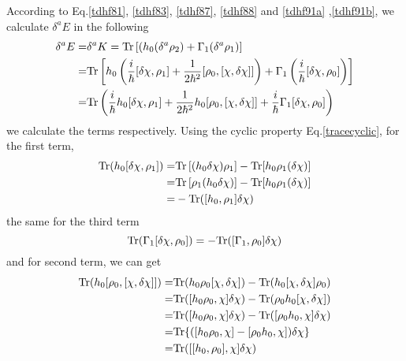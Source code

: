   According to Eq.\eqref{tdhf81}, \eqref{tdhf83}, \eqref{tdhf87}, \eqref{tdhf88} and \eqref{tdhf91a} ,\eqref{tdhf91b}, we calculate $\delta^aE$ in the following
  \begin{equation}
    \begin{aligned}
          \delta^a E =& \delta^a K = {\rm Tr}\left[(h_0(\delta^a\rho_2) + \Gamma_1(\delta^a\rho_1)\right]\\  \label{tdhf95}
          =& {\rm Tr}\left[ h_0\left( \frac{i}{\hbar} [\delta\chi,\rho_1] + \frac{1}{2\hbar^2}[\rho_0, [\chi, \delta\chi]] \right) + \Gamma_1\left( \frac{i}{\hbar}[\delta\chi, \rho_0] \right) \right]\\
          =& {\rm Tr}\left( \frac{i}{\hbar} h_0 [\delta\chi,\rho_1] + \frac{1}{2\hbar^2} h_0 [\rho_0, [\chi, \delta\chi]] + \frac{i}{\hbar} \Gamma_1 [\delta\chi, \rho_0] \right)
    \end{aligned}
  \end{equation}
  we calculate the terms respectively. Using the cyclic property Eq.\eqref{tracecyclic}, for the first term,
  \begin{equation}
    \begin{aligned}
      {\rm Tr}(h_0 [\delta\chi,\rho_1]) =& {\rm Tr}\left[ (h_0\delta\chi)\rho_1] - {\rm Tr}[h_0\rho_1(\delta\chi) \right]\\ \label{tdhf96}
      =& {\rm Tr}\left[ \rho_1(h_0\delta\chi)] - {\rm Tr}[h_0\rho_1(\delta\chi) \right]\\
      =& -{\rm Tr}([h_0 ,\rho_1]\delta\chi)
    \end{aligned}
  \end{equation}
  the same for the third term
  \begin{equation}
    {\rm Tr}(\Gamma_1 [\delta\chi,\rho_0]) = -{\rm Tr}([\Gamma_1,\rho_0]\delta\chi) \label{tdhf97}
  \end{equation}
  and for second term, we can get
  \begin{equation}
    \begin{aligned}
      {\rm Tr}(h_0 [\rho_0, [\chi, \delta\chi]]) =&{\rm Tr}(h_0\rho_0[\chi,\delta\chi]) - {\rm Tr}(h_0[\chi,\delta\chi]\rho_0)\\ \label{tdhf98}
      =& {\rm Tr}([h_0\rho_0,\chi]\delta\chi) - {\rm Tr}(\rho_0h_0[\chi,\delta\chi])\\
      =& {\rm Tr}([h_0\rho_0,\chi]\delta\chi) - {\rm Tr}([\rho_0h_0,\chi]\delta\chi)\\
      =& {\rm Tr}\{([h_0\rho_0,\chi] - [\rho_0h_0,\chi])\delta\chi\}\\
      =& {\rm Tr}([[h_0, \rho_0],\chi]\delta\chi)\\
    \end{aligned}
  \end{equation}
